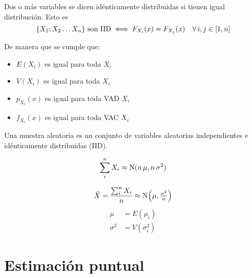 Dos o más variables se dicen idénticamente distribuidas si tienen igual distribución.
Esto es
\begin{equation*}
    \inBraces{X_1;X_2 \dots X_n} \text{ son IID} \iff F_{X_i}(x)=F_{X_j}(x) \quad \forall \, i,j \in [1,n]
\end{equation*}

De manera que se cumple que:
\begin{itemize}
    \item $E(X_i)$ es igual para toda $X_i$
    \item $V(X_i)$ es igual para toda $X_i$
    \item $p_{X_i}(x)$ es igual para toda VAD $X_i$
    \item $f_{X_i}(x)$ es igual para toda VAC $X_i$
\end{itemize}

Una muestra aleatoria es un conjunto de variables aleatorias independientes e idénticamente distribuidas (IID).

\begin{mdframed}[style=PropertyFrame]
    \begin{prop}
    \end{prop}
    \begin{equation*}
        \sum_i^n X_i \approx \nor(n \, \mu , n \, \sigma^2)
    \end{equation*}
\end{mdframed}

\begin{mdframed}[style=PropertyFrame]
    \begin{prop}
    \end{prop}
    \begin{equation*}
        \ave{X} = \dfrac{\sum_i^n X_i}{n} \approx \fx[\nor]{\mu, \tfrac{\sigma^2}{n}}
    \end{equation*}
    \begin{align*}
        \mu &= E(\mu_i) 
        \\
        \sigma^2 &= V(\sigma_i^2)
    \end{align*}
\end{mdframed}


\section{Estimación puntual}

